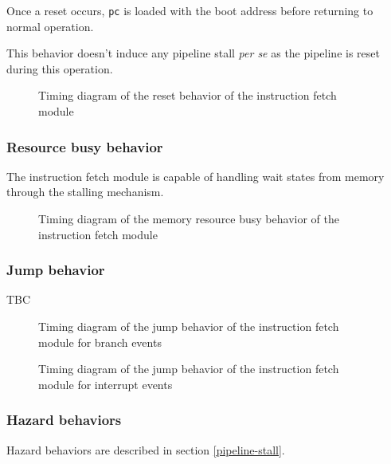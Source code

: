       \begin{content}
          Once a reset occurs, \texttt{pc} is loaded with the boot address before returning to normal operation.

          This behavior doesn't induce any pipeline stall \textit{per se} as the pipeline is reset during this operation.
        \end{content}

      \begin{figure}[H]
          \centering
          
          \caption{Timing diagram of the reset behavior of the instruction fetch module}
          \label{fig:ifm-behavior-reset}
        \end{figure}

    \subsubsection{Resource busy behavior}

      \begin{content}
          The instruction fetch module is capable of handling wait states from memory through the stalling mechanism.
        \end{content}

      \begin{figure}[H]
          \centering
          
          \caption{Timing diagram of the memory resource busy behavior of the instruction fetch module}
          \label{fig:ifm-behavior-wait}
        \end{figure}

    \subsubsection{Jump behavior}

      \begin{content}
          TBC
        \end{content}

      \begin{figure}[H]
          \centering
          
          \caption{Timing diagram of the jump behavior of the instruction fetch module for branch events}
          \label{fig:ifm-behavior-branch}
        \end{figure}

      \begin{figure}[H]
          \centering
          
          \caption{Timing diagram of the jump behavior of the instruction fetch module for interrupt events}
          \label{fig:ifm-behavior-interrupt}
        \end{figure}

    \subsubsection{Hazard behaviors}

      \begin{content}
          Hazard behaviors are described in section \ref{pipeline-stall}.
        \end{content}

\newpage

